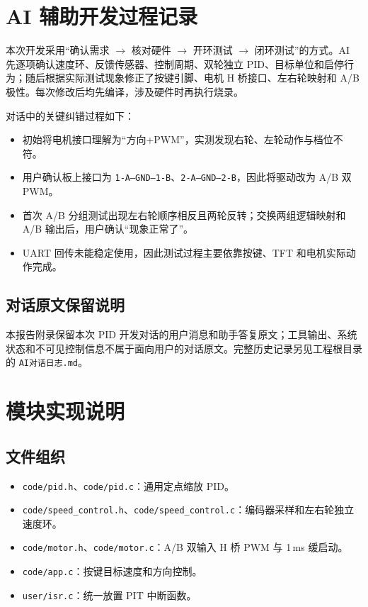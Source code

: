 \documentclass[11pt,a4paper,fontset=fandol]{ctexart}
\begin{document}
\section{AI 辅助开发过程记录}

本次开发采用“确认需求 $\rightarrow$ 核对硬件 $\rightarrow$ 开环测试 $\rightarrow$ 闭环测试”的方式。AI 先逐项确认速度环、反馈传感器、控制周期、双轮独立 PID、目标单位和启停行为；随后根据实际测试现象修正了按键引脚、电机 H 桥接口、左右轮映射和 A/B 极性。每次修改后均先编译，涉及硬件时再执行烧录。

对话中的关键纠错过程如下：

\begin{itemize}
\item 初始将电机接口理解为“方向+PWM”，实测发现右轮、左轮动作与档位不符。
\item 用户确认板上接口为 \texttt{1-A--GND--1-B}、\texttt{2-A--GND--2-B}，因此将驱动改为 A/B 双 PWM。
\item 首次 A/B 分组测试出现左右轮顺序相反且两轮反转；交换两组逻辑映射和 A/B 输出后，用户确认“现象正常了”。
\item UART 回传未能稳定使用，因此测试过程主要依靠按键、TFT 和电机实际动作完成。
\end{itemize}

\subsection{对话原文保留说明}

本报告附录保留本次 PID 开发对话的用户消息和助手答复原文；工具输出、系统状态和不可见控制信息不属于面向用户的对话原文。完整历史记录另见工程根目录的 \texttt{AI对话日志.md}。

\section{模块实现说明}

\subsection{文件组织}

\begin{itemize}
\item \texttt{code/pid.h}、\texttt{code/pid.c}：通用定点缩放 PID。
\item \texttt{code/speed\_control.h}、\texttt{code/speed\_control.c}：编码器采样和左右轮独立速度环。
\item \texttt{code/motor.h}、\texttt{code/motor.c}：A/B 双输入 H 桥 PWM 与 1\,ms 缓启动。
\item \texttt{code/app.c}：按键目标速度和方向控制。
\item \texttt{user/isr.c}：统一放置 PIT 中断函数。
\end{itemize}
\end{document}
